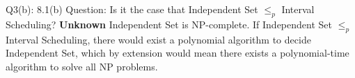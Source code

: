 \begin{problem}
  {Q3(b): 8.1(b)}
  Question: Is it the case that Independent Set $\leq_{p}$ Interval Scheduling?
  \textbf{Unknown}
  Independent Set is NP-complete. If Independent Set $\leq_{p}$ Interval Scheduling, there would exist a polynomial algorithm to decide
  Independent Set, which by extension would mean there exists a polynomial-time algorithm to solve all NP problems.
\end{problem}
